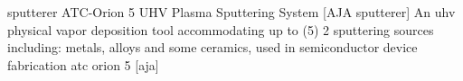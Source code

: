 \newglsXequipment%
{sputterer}%
{ATC{\--}Orion 5 UHV Plasma Sputtering System}%
[AJA sputterer]%
{An \gls{uhv} physical vapor deposition tool accommodating up to (\num{5}) \SI{2}{\inch} sputtering sources including: metals, alloys and some ceramics, used in semiconductor device fabrication}%
{atc orion 5}%
[aja]%